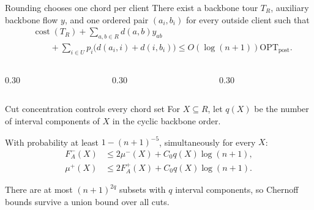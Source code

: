\documentclass[aspectratio=169,12pt]{beamer}
\newcommand{\OPT}{\mathrm{OPT}}
\newcommand{\optpost}{\OPT_{\mathrm{post}}}
\newcommand{\cost}{\operatorname{cost}}
\newcommand{\1}{\mathbf{1}}
\begin{document}
\begin{frame}{Rounding chooses one chord per client}
  \vspace{0.06cm}
  There exist a backbone tour \(T_R\), auxiliary backbone flow \(y\), and one
  ordered pair \((a_i,b_i)\) for every outside client such that
  {\fontsize{11.0pt}{13.2pt}\selectfont
  \[
    \begin{aligned}
      &\cost(T_R)+\sum_{a,b\in R}d(a,b)y_{ab}\\[-1mm]
      &\qquad+\sum_{i\in U}p_i\bigl(d(a_i,i)+d(i,b_i)\bigr)
      \le O(\log(n+1))\optpost.
    \end{aligned}
  \]}

  \vspace{0.06cm}
  \begin{columns}[T,onlytextwidth]
    \begin{column}{0.30\textwidth}
      \centering
    \end{column}
    \begin{column}{0.30\textwidth}
      \centering
    \end{column}
    \begin{column}{0.30\textwidth}
      \centering
    \end{column}
  \end{columns}
\end{frame}

\begin{frame}{Cut concentration controls every chord set}
  For \(X\subseteq R\), let \(q(X)\) be the number of interval components of
  \(X\) in the cyclic backbone order.

  \vspace{0.16cm}
  With probability at least \(1-(n+1)^{-5}\), simultaneously for every \(X\):
  \[
  \begin{aligned}
    F_A^-(X)&\le2\mu^-(X)+C_0q(X)\log(n+1),\\
    \mu^+(X)&\le2F_A^+(X)+C_0q(X)\log(n+1).
  \end{aligned}
  \]

  \vspace{0.22cm}
  There are at most \((n+1)^{2q}\) subsets with \(q\) interval components, so
  Chernoff bounds survive a union bound over all cuts.
\end{frame}
\end{document}
